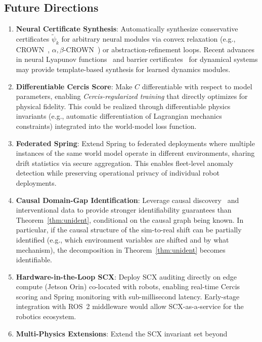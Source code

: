 \documentclass[11pt,twocolumn]{article}
\theoremstyle{definition}
\begin{document}
\subsection{Future Directions}

\begin{enumerate}[leftmargin=*,nosep]
  \item \textbf{Neural Certificate Synthesis}: Automatically synthesize
    conservative certificates $\tilde{\psi}_k$ for arbitrary neural modules
    via convex relaxation (e.g., CROWN~\cite{zhang2018crown},
    $\alpha,\beta$-CROWN~\cite{wang2021beta}) or abstraction-refinement loops.
    Recent advances in neural Lyapunov functions~\cite{chang2019neural} and
    barrier certificates~\cite{qin2021safe} for dynamical systems may provide
    template-based synthesis for learned dynamics modules.
  \item \textbf{Differentiable Cercis Score}: Make $C$ differentiable with
    respect to model parameters, enabling \emph{Cercis-regularized training}
    that directly optimizes for physical fidelity.  This could be realized
    through differentiable physics invariants (e.g., automatic differentiation
    of Lagrangian mechanics constraints) integrated into the world-model loss
    function.
  \item \textbf{Federated Spring}: Extend Spring to federated deployments
    where multiple instances of the same world model operate in different
    environments, sharing drift statistics via secure aggregation.  This
    enables fleet-level anomaly detection while preserving operational
    privacy of individual robot deployments.
  \item \textbf{Causal Domain-Gap Identification}: Leverage causal
    discovery~\cite{spirtes2000causation} and interventional data to provide
    stronger identifiability guarantees than Theorem~\ref{thm:unident},
    conditional on the causal graph being known.  In particular, if the causal
    structure of the sim-to-real shift can be partially identified (e.g., which
    environment variables are shifted and by what mechanism), the
    decomposition in Theorem~\ref{thm:unident} becomes identifiable.
  \item \textbf{Hardware-in-the-Loop SCX}: Deploy SCX auditing directly on
    edge compute (Jetson Orin) co-located with robots, enabling real-time
    Cercis scoring and Spring monitoring with sub-millisecond latency.
    Early-stage integration with ROS~2 middleware would allow
    SCX-as-a-service for the robotics ecosystem.
  \item \textbf{Multi-Physics Extensions}: Extend the SCX invariant set beyond

\end{enumerate}
\end{document}
